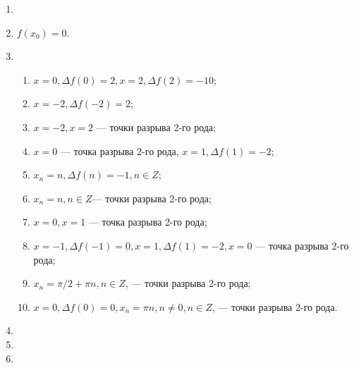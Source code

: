 \documentclass[a4paper]{article}
\begin{document}
\begin{enumerate} [label=\textbf{\arabic*.}]
ОТВЕТЫ
\setcounter{enumi}{10}
\item {}
\setcounter{enumi}{14}
\item $f(x_0)=0$.
\setcounter{enumi}{17}
\item	 \begin{enumerate}
	\item $x=0,\Delta f(0)=2, x=2, \Delta f(2)=-10$;
	\item $x=-2,\Delta f(-2)=2$;
	\item $x=-2, x=2$ --- точки разрыва 2-го рода;
	\item $x=0$ --- точка разрыва 2-го рода, $x=1, \Delta f(1)=-2$;
	\item $x_n=n, \Delta f(n)=-1, n\in Z$;
	\item $x_n=n, n\in Z$--- точки разрыва 2-го рода;
	\item $x=0, x=1$ --- точка разрыва 2-го рода;	
	\item $x=-1, \Delta f(-1)=0, x=1, \Delta f(1)=-2, x=0$ --- точка разрыва 2-го рода;
	\item $x_n=\pi/2+\pi n, n \in Z$, --- точки разрыва 2-го рода;
	\item $x=0, \Delta f(0)=0, x_n=\pi n, n\not=0, n \in Z$, --- точки разрыва 2-го рода.
\end{enumerate}
\item {}
\item {}
\setcounter{enumi}{24}
\item  \begin{enumerate}

\end{enumerate}
\end{enumerate}
\end{document}
